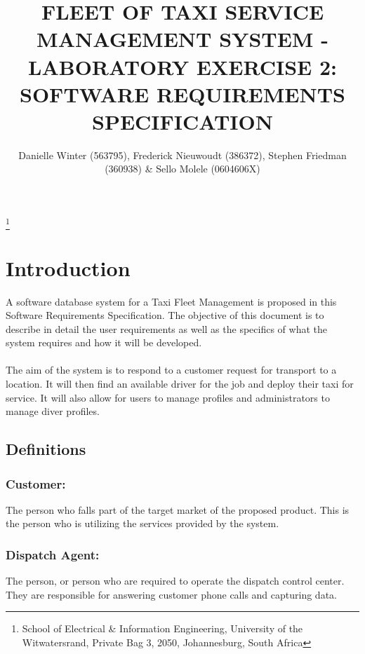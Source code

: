 \documentclass[10pt,twocolumn]{witseiepaper}
\begin{document}
\title{FLEET OF TAXI SERVICE MANAGEMENT SYSTEM - LABORATORY EXERCISE 2: SOFTWARE REQUIREMENTS SPECIFICATION}

\author{Danielle Winter (563795), Frederick Nieuwoudt (386372), Stephen Friedman (360938) \& Sello Molele (0604606X)}
\thanks{School of Electrical \& Information Engineering, University of the
Witwatersrand, Private Bag 3, 2050, Johannesburg, South Africa}


%

\maketitle
\thispagestyle{empty}\pagestyle{empty}


%
\section{Introduction}
A software database system for a Taxi Fleet Management is proposed in this Software Requirements Specification. The objective of this document is to describe in detail the user requirements as well as the specifics of what the system requires and how it will be developed.\\\\
The aim of the system is to respond to a customer request for transport to a location. It will then find an available driver for the job and deploy their taxi for service. It will also allow for users to manage profiles and administrators to manage diver profiles.

\subsection{Definitions}

\subsubsection{Customer:}
The person who falls part of the target market of the proposed product. This is the person who is utilizing the services provided by the system.

\subsubsection{Dispatch Agent:}
The person, or person who are required to operate the dispatch control center. They are responsible for answering customer phone calls and capturing data.
\end{document}
